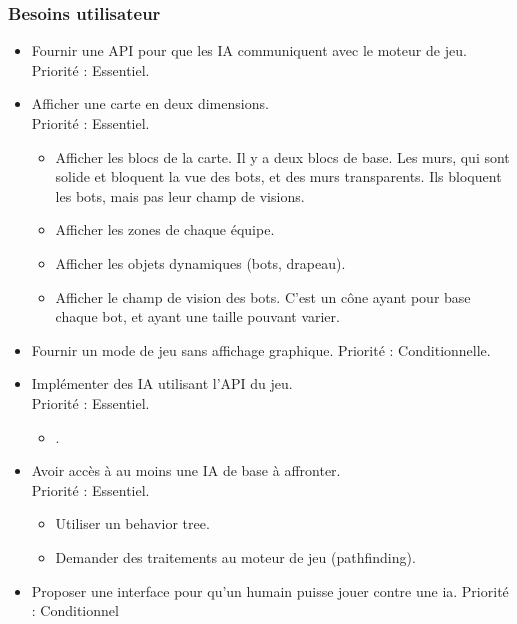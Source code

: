 \documentclass[french]{article}
\begin{document}
\subsubsection{Besoins utilisateur}
    \begin{itemize}
        \item Fournir une API pour que les IA communiquent avec le moteur de jeu. \\
                Priorité : Essentiel.\\

        \item Afficher une carte en deux dimensions. \\
            Priorité : Essentiel.
            \begin{itemize}
                \item Afficher les blocs de la carte. Il y a deux blocs de base. Les murs, qui sont solide et bloquent la vue des bots, et des murs transparents. Ils bloquent les bots, mais pas leur champ de visions.
                \item Afficher les zones de chaque équipe.
                \item Afficher les objets dynamiques (bots, drapeau).
                \item Afficher le champ de vision des bots. C'est un cône ayant pour base chaque bot, et ayant une taille pouvant varier. \\
            \end{itemize}
            
        \item Fournir un mode de jeu sans affichage graphique.
            Priorité : Conditionnelle.\\

        \item Implémenter des IA utilisant l'API du jeu. \\
            Priorité : Essentiel.
            \begin{itemize}
                \item .\\
            \end{itemize}

        \item Avoir accès à au moins une IA de base à affronter. \\
            Priorité : Essentiel.
            \begin{itemize}
                \item Utiliser un behavior tree.
                \item Demander des traitements au moteur de jeu (pathfinding).\\
            \end{itemize}
            
        \item Proposer une interface pour qu'un humain puisse jouer contre une ia.
            Priorité : Conditionnel \\

    \end{itemize}
\end{document}
